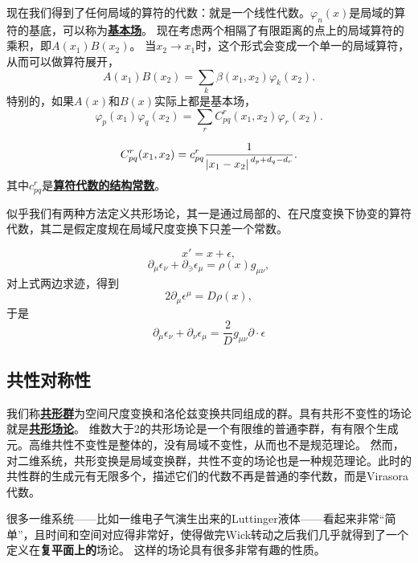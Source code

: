 \documentclass[hyperref, UTF8, a4paper]{ctexart}
\newcommand{\concept}[1]{\underline{\textbf{#1}}}
\renewcommand{\emph}{\textbf}
\begin{document}
现在我们得到了任何局域的算符的代数：就是一个线性代数。$\varphi_n(x)$是局域的算符的基底，可以称为\concept{基本场}。
现在考虑两个相隔了有限距离的点上的局域算符的乘积，即$A(x_1) B(x_2)$。
当$x_2 \to x_1$时，这个形式会变成一个单一的局域算符，从而可以做算符展开，
\begin{equation}
    A(x_1) B(x_2) = \sum_{k} \beta(x_1, x_2) \varphi_k(x_2).
\end{equation}
特别的，如果$A(x)$和$B(x)$实际上都是基本场，
\begin{equation}
    \varphi_p(x_1) \varphi_q(x_2) = \sum_{r} C_{pq}^r(x_1, x_2) \varphi_r(x_2). 
\end{equation}

\begin{equation}
    C_{pq}^r(x_1, x_2) = c_{pq}^r \frac{1}{\abs*{x_1 - x_2}^{d_p + d_q - d_r}}.
\end{equation}
其中$c_{pq}^r$是\concept{算符代数的结构常数}。

似乎我们有两种方法定义共形场论，其一是通过局部的、在尺度变换下协变的算符代数，其二是假定度规在局域尺度变换下只差一个常数。

\begin{equation}
    x' = x + \epsilon,
\end{equation}
\begin{equation}
    \partial_\mu \epsilon_\nu + \partial_\ni \epsilon_\mu = \rho(x) g_{\mu \nu},
\end{equation}
对上式两边求迹，得到
\[
    2 \partial_\mu \epsilon^\mu = D \rho(x),
\]
于是
\begin{equation}
    \partial_\mu \epsilon_\nu + \partial_\nu \epsilon_\mu = \frac{2}{D} g_{\mu \nu} \partial \cdot \epsilon
\end{equation}


\subsection{共性对称性}

我们称\concept{共形群}为空间尺度变换和洛伦兹变换共同组成的群。具有共形不变性的场论就是\concept{共形场论}。
维数大于2的共形场论是一个有限维的普通李群，有有限个生成元。高维共性不变性是整体的，没有局域不变性，从而也不是规范理论。
然而，对二维系统，共形变换是局域变换群，共性不变的场论也是一种规范理论。此时的共性群的生成元有无限多个，描述它们的代数不再是普通的李代数，而是Virasora代数。

很多一维系统——比如一维电子气演生出来的Luttinger液体——看起来非常“简单”，且时间和空间对应得非常好，使得做完Wick转动之后我们几乎就得到了一个定义在\emph{复平面上的}场论。
这样的场论具有很多非常有趣的性质。
\end{document}
